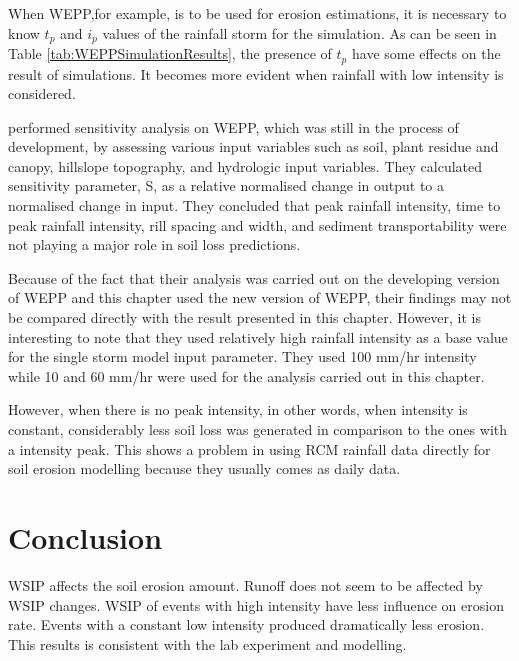 
When WEPP,for example, is to be used for erosion estimations, it is
necessary to know $t_p$ and $i_p$ values of the rainfall storm for the
simulation.
As can be seen in Table \ref{tab:WEPPSimulationResults}, the presence of
$t_p$ have some effects on the result of simulations. It becomes more
evident when rainfall with low intensity is considered.

\citet{nearing1990-839} performed sensitivity analysis on WEPP, which was
still in the process of development, by assessing various input variables
such as soil, plant residue and canopy, hillslope topography, and hydrologic
input variables. They calculated sensitivity parameter, S, as a relative
normalised change in output to a normalised change in input.
They concluded that peak rainfall intensity, time to peak rainfall
intensity, rill spacing and width, and sediment transportability were not
playing a major role in soil loss predictions.

Because of the fact that their analysis was carried out on the developing
version of WEPP and this chapter used the new version of WEPP, their
findings may not be compared directly with the result presented in this
chapter. However, it is interesting to note that they used relatively high
rainfall intensity as a base value for the single storm model input
parameter. They used 100 mm/hr intensity while 10 and 60 mm/hr were used for
the analysis carried out in this chapter.


However, when there is no peak intensity, in other words, when intensity is
constant, considerably less soil loss was generated in comparison to the
ones with a intensity peak.
This shows a problem in using RCM rainfall data directly for soil erosion
modelling because they usually comes as daily data.

\section{Conclusion}
\label{sec:ImpactsOfRainfallIntensityChangesOnRunoffAndErosionConclusion}
WSIP affects the soil erosion amount.
Runoff does not seem to be affected by WSIP
changes.
WSIP of events with high intensity have less
influence on erosion rate. Events with a constant low intensity produced
dramatically less erosion. This results is consistent with the lab
experiment and modelling.






